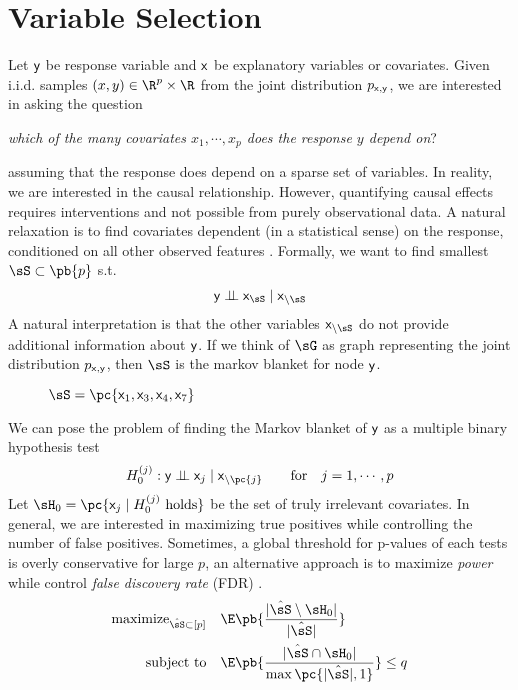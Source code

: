 \documentclass[11pt]{article}
\begin{document}
\section{Variable Selection}
 
Let $\mathsf{y}$ be response variable and $\mathsf{x}$ be explanatory variables or covariates. Given i.i.d. samples $(x,y)\in\R^p\times\R$ from the joint distribution $p_{\mathsf{x},\mathsf{y}}$, we are interested in asking the question 
\begin{center}
    \textit{which of the many covariates $x_1,\cdots,x_p$ does the response $y$ depend on}?
\end{center}
assuming that the response does depend on a sparse set of variables. In reality, we are interested in the causal relationship. However, quantifying causal effects requires interventions and not possible from purely observational data. A natural relaxation is to find covariates dependent (in a statistical sense) on the response, conditioned on all other observed features \cite{gimenezKnockoffsMassNew2019}. Formally, we want to find smallest $\sS\subset\pb{p}$ s.t.
\begin{align*}
    \ry \dperp \rx_{\sS} \mid \rx_{\setminus\sS}
\end{align*} 
A natural interpretation is that the other variables $\rx_{\setminus\sS}$ do not provide additional information about $\mathsf{y}$. If we think of $\sG$ as graph representing the joint distribution $p_{\mathsf{x},\mathsf{y}}$, then $\sS$ is the markov blanket for node $\mathsf{y}$. 
\begin{figure}[h!]
    \caption{$\sS =\pc{\rx_1,\rx_3,\rx_4,\rx_7}$}
\end{figure}
We can pose the problem of finding the Markov blanket of $\mathsf{y}$ as a multiple binary hypothesis test
\begin{align} 
    H_0^{(j)}:
        \ry \dperp \rx_j \mid \rx_{\setminus \pc{j}} 
    \quad\quad\text{for}\quad
        j = 1,\cdots,p
    \label{eq:test_markov_blanket}
\end{align}
Let $\sH_0 = \pc{\rx_j \mid H_0^{(j)} \text{ holds}}$ be the set of truly irrelevant covariates. In general, we are interested in maximizing true positives while controlling the number of false positives. Sometimes, a global threshold for p-values of each tests is overly conservative for large $p$, an alternative approach is to maximize \textit{power} while control \textit{false discovery rate} (FDR) \cite{benjaminiControllingFalseDiscovery1995}.
\begin{align}
    \text{maximize}_{\hat{\sS}\subset [p]}\quad
        &\E\pb{\frac{ |\hat{\sS} \setminus \sH_0| }{ |\hat{\sS}| }} \nonumber \\
    \text{subject to}\quad
        &\E\pb{ \frac{ |\hat{\sS} \cap \sH_0| }{ \max\pc{|\hat{\sS}|,1} } } \leq q
    \label{eq:opt_fdr_control}
\end{align}
\end{document}
